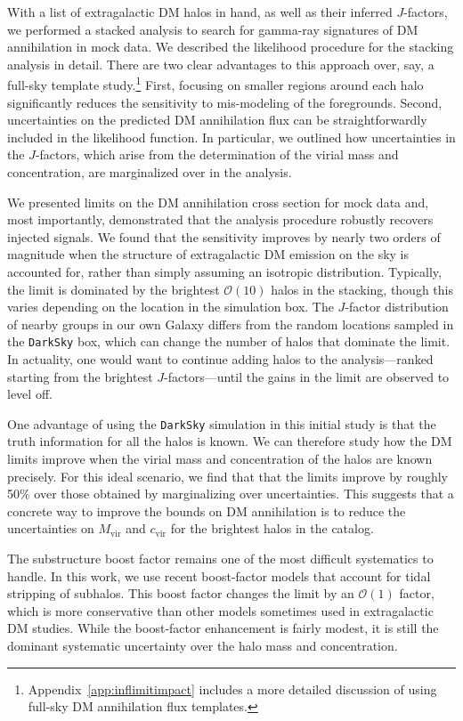 With a list of extragalactic DM halos in hand, as well as their inferred $J$-factors, we performed a stacked analysis to search for gamma-ray signatures of DM annihilation in mock data.  We described the likelihood procedure for the stacking analysis in detail.  There are two clear advantages to this approach over, say,  a full-sky template study.\footnote{ Appendix~\ref{app:inflimitimpact} includes a more detailed discussion of using full-sky DM annihilation flux templates.}  First, focusing on smaller regions around each halo significantly reduces the sensitivity to mis-modeling of the foregrounds.  Second, uncertainties on the predicted DM annihilation flux can be straightforwardly included in the likelihood function.  In particular, we outlined how uncertainties in the $J$-factors, which arise from the determination of the virial mass and concentration, are marginalized over in the analysis. 

We presented limits on the DM annihilation cross section for mock data and, most importantly, demonstrated that the analysis procedure robustly recovers injected signals.  We found that the sensitivity improves by nearly two orders of magnitude when the structure of extragalactic DM emission on the sky is accounted for, rather than simply assuming an isotropic distribution.  Typically, the limit is dominated by the brightest $\mathcal{O}(10)$ halos in the stacking, though this varies depending on the location in the simulation box.  The $J$-factor distribution of nearby groups in our own Galaxy differs from the random locations sampled in the \texttt{DarkSky} box, which can change the number of halos that dominate the limit.  In actuality, one would want to continue adding halos to the analysis---ranked starting from the brightest $J$-factors---until the gains in the limit are observed to level off.

One advantage of using the \texttt{DarkSky} simulation in this initial study is that the truth information for all the halos is known.  We can therefore study how the DM limits improve when the virial mass and  concentration of the halos are known precisely.  For this ideal scenario, we find that that the limits improve by roughly 50\% over those obtained by marginalizing over uncertainties.  This suggests that a concrete way to improve the bounds on DM annihilation is to reduce the uncertainties on $M_\text{vir}$ and $c_\text{vir}$ for the brightest halos in the catalog.

The substructure boost factor remains one of the most difficult systematics to handle.  In this work, we use recent boost-factor models that account for tidal stripping of subhalos.  This boost factor changes the limit by an $\mathcal{O}(1)$ factor, which is more conservative than other models sometimes used in extragalactic DM studies.  While the boost-factor enhancement is fairly modest, it is still the dominant systematic uncertainty over the halo mass and  concentration.   

